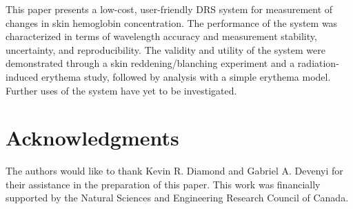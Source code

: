 This paper presents a low-cost, user-friendly DRS system for measurement of changes in skin hemoglobin concentration. The performance of the system was characterized in terms of wavelength accuracy and measurement stability, uncertainty, and reproducibility. The validity and utility of the system were demonstrated through a skin reddening/blanching experiment and a radiation-induced erythema study, followed by analysis with a simple erythema model. Further uses of the system have yet to be investigated.

\section*{Acknowledgments}
The authors would like to thank Kevin R. Diamond and Gabriel A. Devenyi for their assistance in the preparation of this paper. This work was financially supported by the Natural Sciences and Engineering Research Council of Canada.